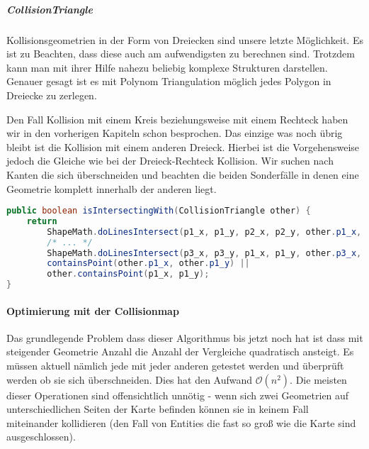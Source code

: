 \subparagraph{CollisionTriangle}

Kollisionsgeometrien in der Form von Dreiecken sind unsere letzte Möglichkeit. Es ist zu Beachten, dass diese auch am aufwendigsten zu berechnen sind. Trotzdem kann man mit ihrer Hilfe nahezu beliebig komplexe Strukturen darstellen. Genauer gesagt ist es mit Polynom Triangulation möglich jedes Polygon in Dreiecke zu zerlegen. %

Den Fall Kollision mit einem Kreis beziehungsweise mit einem Rechteck haben wir in den vorherigen Kapiteln schon besprochen. Das einzige was noch übrig bleibt ist die Kollision mit einem anderen Dreieck. Hierbei ist die Vorgehensweise jedoch die Gleiche wie bei der Dreieck-Rechteck Kollision. Wir suchen nach Kanten die sich überschneiden und beachten die beiden Sonderfälle in denen eine Geometrie komplett innerhalb der anderen liegt.

\doinline
\begin{lstlisting}[caption=Erkennen von Kollisionen (Dreieck-Dreieck), title=\hspace{0 pt}, language=java]
public boolean isIntersectingWith(CollisionTriangle other) {
	return
		ShapeMath.doLinesIntersect(p1_x, p1_y, p2_x, p2_y, other.p1_x, other.p1_y, other.p2_x, other.p2_y) ||
		/* ... */
		ShapeMath.doLinesIntersect(p3_x, p3_y, p1_x, p1_y, other.p3_x, other.p3_y, other.p1_x, other.p1_y) ||
		containsPoint(other.p1_x, other.p1_y) ||
		other.containsPoint(p1_x, p1_y);
}
\end{lstlisting}

\paragraph{Optimierung mit der Collisionmap}

Das grundlegende Problem dass dieser Algorithmus bis jetzt noch hat ist dass mit steigender Geometrie Anzahl die Anzahl der Vergleiche quadratisch ansteigt. 
Es müssen aktuell nämlich jede  mit jeder anderen getestet werden und überprüft werden ob sie sich überschneiden.
Dies hat den Aufwand $\mathcal O(n^2)$.
Die meisten dieser Operationen sind offensichtlich unnötig - wenn sich zwei Geometrien auf unterschiedlichen Seiten der Karte befinden können sie in keinem Fall miteinander kollidieren (den Fall von Entities die fast so groß wie die Karte sind ausgeschlossen).

